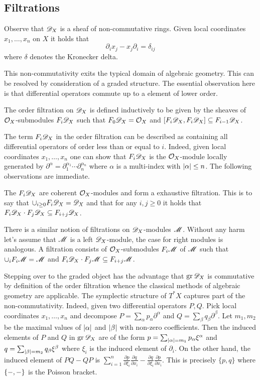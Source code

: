 \subsection{Filtrations}
Observe that $\mathscr{D}_X$ is a sheaf of non-commutative rings.
Given local coordinates $x_1,\ldots, x_n$ on $X$ it holds that
$$\partial_i x_j - x_j\partial_i = \delta_{ij} $$
where $\delta$ denotes the Kronecker delta.

This non-commutativity exits the typical domain of algebraic geometry.
This can be resolved by consideration of a graded structure.
The essential observation here is that differential operators commute up to a element of lower order.
\begin{definition}
  The order filtration on $\mathscr{D}_X$ is defined inductively to be given by the sheaves of $\mathcal{O}_X$-submodules $F_i \mathscr{D}_X$ such that $F_0\mathscr{D}_X = \mathcal{O}_X$ and $[F_i\mathscr{D}_X, F_i \mathscr{D}_X] \subseteq F_{i-1}\mathscr{D}_X$.
\end{definition}
The term $F_i \mathscr{D}_X$ in the order filtration can be described as containing all differential operators of order less than or equal to $i$.
Indeed, given local coordinates $x_1,\ldots, x_n$ one can show that $F_i\mathscr{D}_X$ is the $\mathcal{O}_X$-module locally generated by $\partial^\alpha = \partial_1^{\alpha_1}\cdots \partial_n^{\alpha_n}$ where $\alpha$ is a multi-index with $\vert \alpha \vert\leq n$.
The following observations are immediate.
\begin{lemma}
  The $F_i\mathscr{D}_X$ are coherent $\mathcal{O}_X$-modules and form a exhaustive filtration. This is to say that $\cup_{i\geq 0}F_i\mathscr{D}_X = \mathscr{D}_X$
  and that for any $i,j\geq 0$ it holds that $F_i\mathscr{D}_X \cdot F_j \mathscr{D}_X \subseteq F_{i+j}\mathscr{D}_X$.
\end{lemma}
There is a similar notion of filtrations on $\mathscr{D}_X$-modules $\mathscr{M}$.
Without any harm let's assume that $\mathscr{M}$ is a left $\mathscr{D}_X$-module, the case for right modules is analogous.
A filtration consists of $\mathcal{O}_X$-submodules $F_i\mathscr{M}$ of $\mathscr{M}$ such that $\cup_i F_i \mathscr{M} = \mathscr{M}$ and $F_i\mathscr{D}_X \cdot F_j\mathscr{M} \subseteq F_{i+j}\mathscr{M}$.

Stepping over to the graded object has the advantage that $\operatorname{gr} \mathscr{D}_X$ is commutative by definition of the order filtration whence the classical methods of algebraic geometry are applicable.
The symplectic structure of $T^* X$ captures part of the non-commutativity.
Indeed, given two differential operators $P, Q$.
Pick local coordinates $x_1,\ldots, x_n$ and decompose $P = \sum_{\alpha} p_\alpha \partial^\alpha $ and $Q = \sum_{\beta} q_\beta \partial^\beta$.
Let $m_1,m_2$ be the maximal values of $\vert \alpha \vert$ and $\vert \beta \vert$ with non-zero coefficients.
Then the induced elements of $P$ and $Q$ in $\operatorname{gr} \mathscr{D}_X$ are of the form $p = \sum_{\vert \alpha \vert = m_1} p_\alpha \xi^\alpha$ and $q = \sum_{\vert \beta \vert = m_2}q_\beta \xi^\beta $ where $\xi_i$ is the induced element of $\partial_i$.
On the other hand, the induced element of $PQ - QP$ is $\sum_{i=1}^n\frac{\partial p}{\partial \xi_i}\frac{\partial q}{\partial x_i} - \frac{\partial q}{\partial \xi_i}\frac{\partial p}{\partial x_i}$.
This is precisely $\{p,q\}$ where $\{{-},{-}\}$ is the Poisson bracket.

